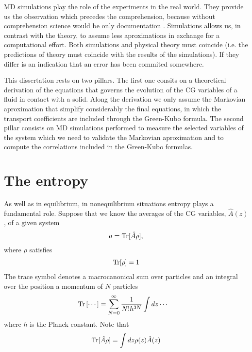 \documentclass[b5paper,openright,10pt]{book}
\begin{document}
MD simulations play the role of the experiments in the real world. They provide us the observation which precedes the comprehension, because without comprehension science would be only documentation \cite{Rapaport}. Simulations allows us, in contrast with the theory, to assume less aproximations in exchange for a computational effort. Both simulations and physical theory must coincide (i.e. the predictions of theory must coincide with the results of the simulations). If they differ is an indication that an error has been commited somewhere.

This dissertation rests on two pillars. The first one consits on a theoretical derivation of the equations that governs the evolution of the CG variables of a fluid in contact with a solid. 
Along the derivation we only assume the Markovian aproximation that simplify considerably the final equations, in which the transport coefficients are included through the Green-Kubo formula. 
The second pillar consists on MD simulations performed to measure the selected variables of the system which we need to validate the Markovian aproximation and to compute the correlations included in the Green-Kubo formulas.

\section{The entropy}\label{Sec:TheEntropy}
As well as in equilibrium, in nonequilibrium situations entropy plays a fundamental role. 
Suppose that we know the averages of the CG variables, $\hat{A}(z)$, of a given system 
\begin{align}
    a = {\rm Tr}[{\hat{A}}\rho] ,
    \label{ave0}
\end{align}
where $\rho$ satisfies
\begin{align}
    {\rm Tr}[\rho] = 1
    \label{intrho}
\end{align}
The trace symbol denotes a macrocanonical sum over particles and an integral over the position a momentum of $N$ particles
\begin{align}
  {\rm Tr}\left[\cdots\right]&=\sum_{N=0}^\infty \frac{1}{N!h^{3N}}
\int dz\cdots
\end{align}
where $h$ is the Planck constant. 
Note that 
\begin{align}
    {\rm Tr}[\hat{A}\rho] = \int dz\rho(z)\hat{A}(z) 
\end{align}
\end{document}
